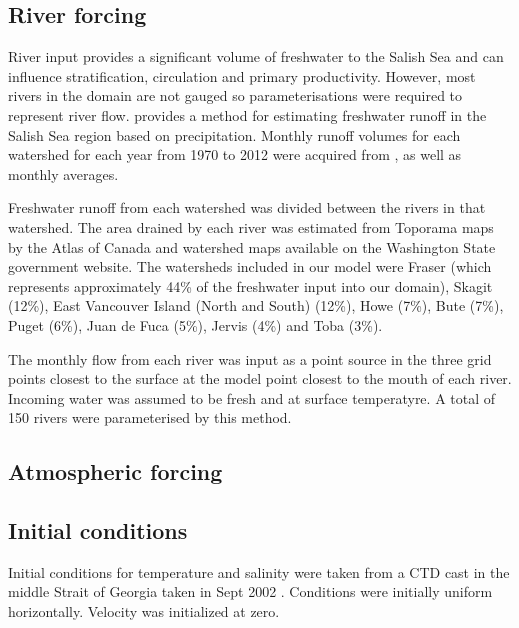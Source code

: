 \documentclass[pdftex,10pt]{article}
\begin{document}
\subsection{River forcing}
River input provides a significant volume of freshwater to the Salish Sea and can influence stratification, circulation and primary productivity. However, most rivers in the domain are not gauged so parameterisations were required to represent river flow. \citet{morrison2011rivers} provides a method for estimating freshwater runoff in the Salish Sea region based on precipitation. Monthly runoff volumes for each watershed for each year from 1970 to 2012 were acquired from \citet{morrison2011rivers}, as well as monthly averages. 

Freshwater runoff from each watershed was divided between the rivers in that watershed. The area drained by each river was estimated from Toporama maps by the Atlas of Canada and watershed maps available on the Washington State government website. The watersheds included in our model were Fraser (which represents approximately 44\% of the freshwater input into our domain), Skagit (12\%), East Vancouver Island (North and South) (12\%), Howe (7\%), Bute (7\%), Puget (6\%), Juan de Fuca (5\%), Jervis (4\%) and Toba (3\%). 

The monthly flow from each river was input as a point source in the three grid points closest to the surface at the model point closest to the mouth of each river. Incoming water was assumed to be fresh and at surface temperatyre. A total of 150 rivers were parameterised by this method. 


\subsection{Atmospheric forcing}

\subsection{Initial conditions}
Initial conditions for temperature and salinity were taken from a CTD cast in the middle Strait of Georgia taken in Sept 2002 \citep{pawlowiczetal2007}.  Conditions were initially uniform horizontally.  Velocity was initialized at zero. 
\end{document}
